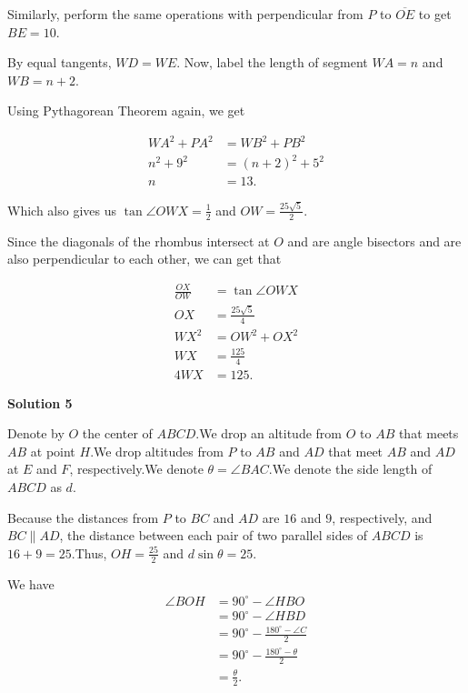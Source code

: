 \begin{enumerate}
{{ Similarly, perform the same operations with perpendicular from $P$ to $\overline{OE}$ to get $BE=10$.

 By equal tangents, $WD=WE$. Now, label the length of segment $WA=n$ and $WB=n+2$.

 Using Pythagorean Theorem again, we get

 
 \begin{align*} WA^2+PA^2&=WB^2+PB^2 \\ n^2+9^2&=(n+2)^2+5^2 \\ n&=13. \end{align*}


 Which also gives us $\tan{\angle{OWX}}=\frac{1}{2}$ and $OW=\frac{25\sqrt{5}}{2}$.

 Since the diagonals of the rhombus intersect at $O$ and are angle bisectors and are also perpendicular to each other, we can get that

 
 \begin{align*} \frac{OX}{OW}&=\tan{\angle{OWX}} \\ OX&=\frac{25\sqrt{5}}{4} \\ WX^2&=OW^2+OX^2 \\ WX&=\frac{125}{4} \\ 4WX&=\boxed{125}. \end{align*}





\textbf{Solution 5}

Denote by $O$ the center of $ABCD$.We drop an altitude from $O$ to $AB$ that meets $AB$ at point $H$.We drop altitudes from $P$ to $AB$ and $AD$ that meet $AB$ and $AD$ at $E$ and $F$, respectively.We denote $\theta = \angle BAC$.We denote the side length of $ABCD$ as $d$.

 Because the distances from $P$ to $BC$ and $AD$ are $16$ and $9$, respectively, and $BC \parallel AD$, the distance between each pair of two parallel sides of $ABCD$ is $16 + 9 = 25$.Thus, $OH = \frac{25}{2}$ and $d \sin \theta = 25$.

 We have
 \begin{align*} \angle BOH & = 90^\circ - \angle HBO \\ & = 90^\circ - \angle HBD \\ & = 90^\circ - \frac{180^\circ - \angle C}{2} \\ & = 90^\circ - \frac{180^\circ - \theta}{2} \\ & = \frac{\theta}{2} . \end{align*}


}}
\end{enumerate}
